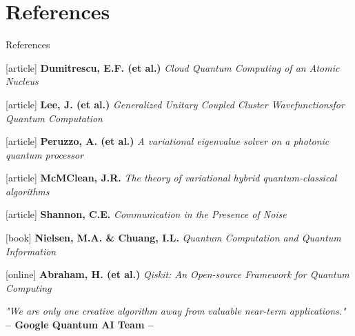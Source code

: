 \documentclass[9pt, handout, aspectratio=169]{beamer}		%
\begin{document}
\section{References}
	\begin{frame}{References}

		\begin{thebibliography}{9}

			 \textbf{Dumitrescu, E.F. (et al.)} \emph{Cloud Quantum Computing of an Atomic Nucleus}

			 \textbf{Lee, J. (et al.)} \emph{Generalized Unitary Coupled Cluster Wavefunctionsfor Quantum Computation}

			 \textbf{Peruzzo, A. (et al.)} \emph{A variational eigenvalue solver on a photonic quantum processor}

			 \textbf{McMClean, J.R.} \emph{The theory of variational hybrid quantum-classical algorithms}

			 \textbf{Shannon, C.E.} \emph{Communication in the Presence of Noise}

			[book]
			 \textbf{Nielsen, M.A. \& Chuang, I.L.} \emph{Quantum Computation and Quantum Information}

			 \textbf{Abraham, H. (et al.)} \emph{Qiskit: An Open-source Framework for Quantum Computing}

		\end{thebibliography}

		\vspace{15pt}
		\begin{small}
		\begin{center}{
		\color{gray}
			\emph{"We are only one creative algorithm away from valuable near-term applications."} \\
			\textbf{– Google Quantum AI Team –} }
		\end{center}
		\end{small}
	\end{frame}

\FinalFrame
\end{document}
